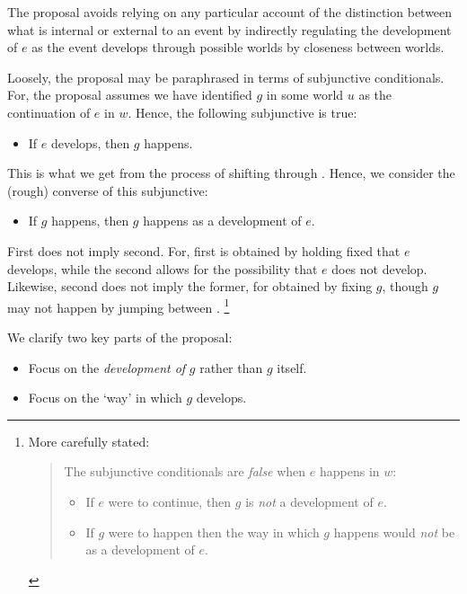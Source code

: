 \begin{note}
  The proposal avoids relying on any particular account of the distinction between what is internal or external to an event by indirectly regulating the development of \(e\) as the event develops through possible worlds by closeness between worlds.

  Loosely, the proposal may be paraphrased in terms of subjunctive conditionals.
  For, the proposal assumes we have identified \(g\) in some world \(u\) as the continuation of \(e\) in \(w\).
  Hence, the following subjunctive is true:
  \begin{itemize}
  \item
    If \(e\) develops, then \(g\) happens.
  \end{itemize}
  This is what we get from the process of shifting through .
  Hence, we consider the (rough) converse of this subjunctive:
  \begin{itemize}
  \item
    If \(g\) happens, then \(g\) happens as a development of \(e\).
  \end{itemize}
  First does not imply second.
  For, first is obtained by holding fixed that \(e\) develops, while the second allows for the possibility that \(e\) does not develop.
  Likewise, second does not imply the former, for obtained by fixing \(g\), though \(g\) may not happen by jumping between .%
  \footnote{
    More carefully stated:
  \begin{quote}
    The subjunctive conditionals are \emph{false} when \(e\) happens in \(w\):
    \begin{itemize}
    \item
      If \(e\) were to continue, then \(g\) is \emph{not} a development of \(e\).
    \item
      If \(g\) were to happen then the way in which \(g\) happens would \emph{not} be as a development of \(e\).
    \end{itemize}
  \end{quote}
  }
\end{note}

\begin{note}
  We clarify two key parts of the proposal:
  \begin{itemize}
  \item
    Focus on the \emph{development of} \(g\) rather than \(g\) itself.
  \item
    Focus on the `way' in which \(g\) develops.
  \end{itemize}
\end{note}

